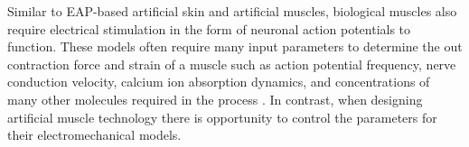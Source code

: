 Similar to EAP-based artificial skin and artificial muscles, biological muscles also require electrical stimulation in the form of neuronal action potentials to function. These models often require many input parameters to determine the out contraction force and strain of a muscle such as action potential frequency, nerve conduction velocity, calcium ion absorption dynamics, and concentrations of many other molecules required in the process \cite{Purves2001}. In contrast, when designing artificial muscle technology there is opportunity to control the parameters for their electromechanical models.
%
%




